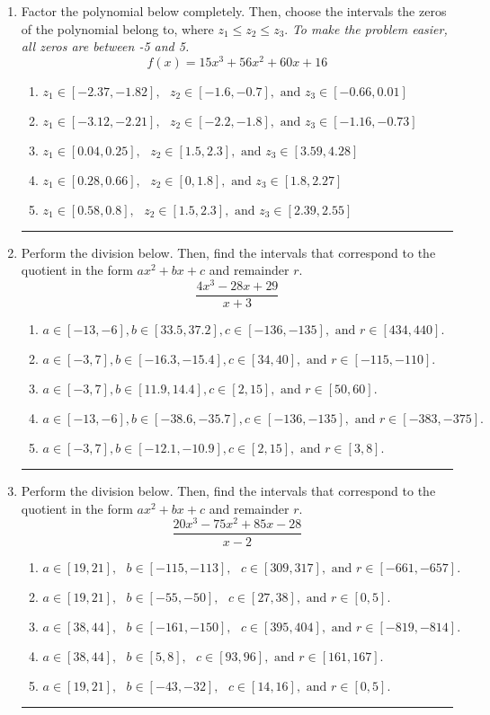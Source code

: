 \documentclass[14pt]{extbook}
\newcommand{\litem}[1]{\item#1\hspace*{-1cm}\rule{\textwidth}{0.4pt}}
\begin{document}
\begin{enumerate}
\litem{
Factor the polynomial below completely. Then, choose the intervals the zeros of the polynomial belong to, where $z_1 \leq z_2 \leq z_3$. \textit{To make the problem easier, all zeros are between -5 and 5.}\[ f(x) = 15x^{3} +56 x^{2} +60 x + 16 \]\begin{enumerate}[label=\Alph*.]
\item \( z_1 \in [-2.37, -1.82], \text{   }  z_2 \in [-1.6, -0.7], \text{   and   } z_3 \in [-0.66, 0.01] \)
\item \( z_1 \in [-3.12, -2.21], \text{   }  z_2 \in [-2.2, -1.8], \text{   and   } z_3 \in [-1.16, -0.73] \)
\item \( z_1 \in [0.04, 0.25], \text{   }  z_2 \in [1.5, 2.3], \text{   and   } z_3 \in [3.59, 4.28] \)
\item \( z_1 \in [0.28, 0.66], \text{   }  z_2 \in [0, 1.8], \text{   and   } z_3 \in [1.8, 2.27] \)
\item \( z_1 \in [0.58, 0.8], \text{   }  z_2 \in [1.5, 2.3], \text{   and   } z_3 \in [2.39, 2.55] \)

\end{enumerate} }
\litem{
Perform the division below. Then, find the intervals that correspond to the quotient in the form $ax^2+bx+c$ and remainder $r$.\[ \frac{4x^{3} -28 x + 29}{x + 3} \]\begin{enumerate}[label=\Alph*.]
\item \( a \in [-13, -6], b \in [33.5, 37.2], c \in [-136, -135], \text{ and } r \in [434, 440]. \)
\item \( a \in [-3, 7], b \in [-16.3, -15.4], c \in [34, 40], \text{ and } r \in [-115, -110]. \)
\item \( a \in [-3, 7], b \in [11.9, 14.4], c \in [2, 15], \text{ and } r \in [50, 60]. \)
\item \( a \in [-13, -6], b \in [-38.6, -35.7], c \in [-136, -135], \text{ and } r \in [-383, -375]. \)
\item \( a \in [-3, 7], b \in [-12.1, -10.9], c \in [2, 15], \text{ and } r \in [3, 8]. \)

\end{enumerate} }
\litem{
Perform the division below. Then, find the intervals that correspond to the quotient in the form $ax^2+bx+c$ and remainder $r$.\[ \frac{20x^{3} -75 x^{2} +85 x -28}{x -2} \]\begin{enumerate}[label=\Alph*.]
\item \( a \in [19, 21], \text{   } b \in [-115, -113], \text{   } c \in [309, 317], \text{   and   } r \in [-661, -657]. \)
\item \( a \in [19, 21], \text{   } b \in [-55, -50], \text{   } c \in [27, 38], \text{   and   } r \in [0, 5]. \)
\item \( a \in [38, 44], \text{   } b \in [-161, -150], \text{   } c \in [395, 404], \text{   and   } r \in [-819, -814]. \)
\item \( a \in [38, 44], \text{   } b \in [5, 8], \text{   } c \in [93, 96], \text{   and   } r \in [161, 167]. \)
\item \( a \in [19, 21], \text{   } b \in [-43, -32], \text{   } c \in [14, 16], \text{   and   } r \in [0, 5]. \)


\end{enumerate}}
\end{enumerate}
\end{document}
